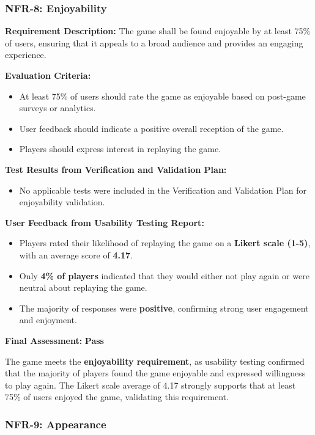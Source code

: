 \documentclass[12pt, titlepage]{article}
\begin{document}
\subsubsection{NFR-8: Enjoyability}
\label{NFR8}

\textbf{Requirement Description:}  
The game shall be found enjoyable by at least 75\% of users, ensuring that it appeals to a broad audience and provides an engaging experience.

\textbf{Evaluation Criteria:}  
\begin{itemize}
    \item At least 75\% of users should rate the game as enjoyable based on post-game surveys or analytics.
    \item User feedback should indicate a positive overall reception of the game.
    \item Players should express interest in replaying the game.
\end{itemize}

\textbf{Test Results from Verification and Validation Plan:}  
\begin{itemize}
    \item No applicable tests were included in the Verification and Validation Plan for enjoyability validation.
\end{itemize}

\textbf{User Feedback from Usability Testing Report:}  
\begin{itemize}
    \item Players rated their likelihood of replaying the game on a \textbf{Likert scale (1-5)}, with an average score of \textbf{4.17}.
    \item Only \textbf{4\% of players} indicated that they would either not play again or were neutral about replaying the game.
    \item The majority of responses were \textbf{positive}, confirming strong user engagement and enjoyment.
\end{itemize}

\textbf{Final Assessment:} \textbf{Pass} 
 
The game meets the \textbf{enjoyability requirement}, as usability testing confirmed that the majority of players found the game enjoyable and expressed willingness to play again. The Likert scale average of 4.17 strongly supports that at least 75\% of users enjoyed the game, validating this requirement.


\subsubsection{NFR-9: Appearance}
\label{NFR9}
\end{document}
